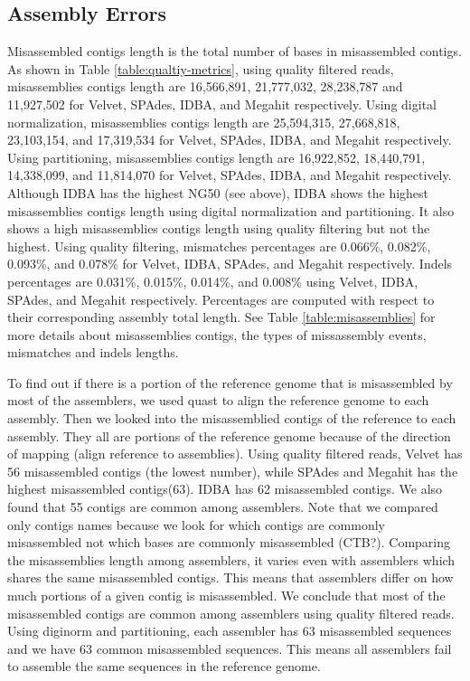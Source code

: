 \subsection*{Assembly Errors} 

 
Misassembled contigs length is the total number of bases in misassembled contigs.  As shown in Table \ref {table:qualtiy-metrics}, using quality filtered reads, misassemblies contigs length are 16,566,891, 21,777,032, 28,238,787 and 11,927,502 for Velvet, SPAdes, IDBA, and Megahit respectively. 
Using digital normalization,  misassemblies contigs length are 25,594,315, 27,668,818, 23,103,154, and 17,319,534 for Velvet, SPAdes, IDBA, and Megahit respectively.  Using partitioning,  misassemblies contigs length are 16,922,852, 18,440,791, 14,338,099, and 11,814,070 for Velvet, SPAdes, IDBA, and Megahit respectively. 
Although IDBA has the highest NG50 (see above), IDBA shows the highest misassemblies contigs length using digital normalization and partitioning. It also shows a high misassemblies contigs length using quality filtering but not the highest.
Using quality filtering, mismatches percentages are 0.066\%, 0.082\%, 0.093\%, and 0.078\% for Velvet, IDBA, SPAdes, and Megahit respectively. Indels percentages are 0.031\%, 0.015\%, 0.014\%, and 0.008\% using Velvet, IDBA, SPAdes, and Megahit respectively. Percentages are computed with respect to their corresponding assembly total length. See Table \ref{table:misassemblies}  for more details about misassemblies contigs, the types of missassembly events, mismatches and indels lengths.



To find out if there is a portion of the reference genome that is misassembled by most of the assemblers, we used quast \cite{quast} to align the reference genome to each assembly. Then we looked into the misassemblied contigs of the reference to each assembly. They all are portions of the reference genome because of the direction of mapping (align reference to assemblies). Using quality filtered reads, Velvet has 56 misassembled contigs (the lowest number), while SPAdes and Megahit has the highest misassembled contigs(63). IDBA has 62 misassembled contigs.  We also found that 55 contigs are common among assemblers. Note that we compared only contigs names because we look for which contigs are commonly misassembled not which bases are commonly misassembled (CTB?). Comparing the misassemblies length among assemblers, it varies even with assemblers which shares the same misassembled contigs. This means that assemblers differ on how much portions of a given contig is misassembled. We conclude that most of the misassembled contigs are common among assemblers using quality filtered reads. 
Using diginorm and partitioning, each assembler has 63 misassembled sequences and we have 63 common misassembled sequences. This means all assemblers fail to assemble the same sequences in the reference genome. 


